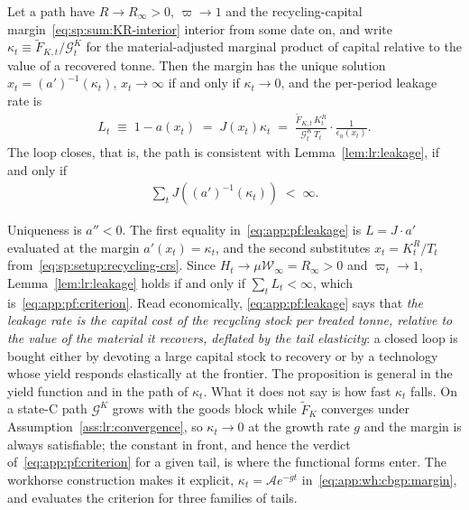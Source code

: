 \begin{proposition}\label{prop:app:pf:closure}
Let a path have $R\to R_\infty>0$, $\varpi\to1$ and the recycling-capital margin~\eqref{eq:sp:sum:KR-interior} interior from some date on, and write $\kappa_t\equiv\tilde F_{K,t}/\mathcal G^K_t$ for the material-adjusted marginal product of capital relative to the value of a recovered tonne. Then the margin has the unique solution $x_t=\left(a'\right)^{-1}\!\left(\kappa_t\right)$, $x_t\to\infty$ if and only if $\kappa_t\to0$, and the per-period leakage rate is
\begin{align}
L_t \;\equiv\; 1-a\left(x_t\right) \;=\; J\left(x_t\right)\kappa_t
\;=\; \frac{\tilde F_{K,t}\,K^R_t}{\mathcal G^K_t\,T_t}\cdot\frac{1}{\epsilon_a\left(x_t\right)} .
\label{eq:app:pf:leakage}
\end{align}
The loop closes, that is, the path is consistent with Lemma~\ref{lem:lr:leakage}, if and only if
\begin{align}
\sum_t J\!\left(\left(a'\right)^{-1}\!\left(\kappa_t\right)\right) \;<\;\infty .
\label{eq:app:pf:criterion}
\end{align}
\end{proposition}

Uniqueness is $a''<0$. The first equality in~\eqref{eq:app:pf:leakage} is $L=J\cdot a'$ evaluated at the margin $a'\left(x_t\right)=\kappa_t$, and the second substitutes $x_t=K^R_t/T_t$ from~\eqref{eq:sp:setup:recycling-crs}. Since $H_t\to\mu\mathcal W_\infty=R_\infty>0$ and $\varpi_t\to1$, Lemma~\ref{lem:lr:leakage} holds if and only if $\sum_tL_t<\infty$, which is~\eqref{eq:app:pf:criterion}. Read economically, \eqref{eq:app:pf:leakage} says that \emph{the leakage rate is the capital cost of the recycling stock per treated tonne, relative to the value of the material it recovers, deflated by the tail elasticity}: a closed loop is bought either by devoting a large capital stock to recovery or by a technology whose yield responds elastically at the frontier. The proposition is general in the yield function and in the path of $\kappa_t$. What it does not say is how fast $\kappa_t$ falls. On a state-C path $\mathcal G^K$ grows with the goods block while $\tilde F_K$ converges under Assumption~\ref{ass:lr:convergence}, so $\kappa_t\to0$ at the growth rate $g$ and the margin is always satisfiable; the constant in front, and hence the verdict of~\eqref{eq:app:pf:criterion} for a given tail, is where the functional forms enter. The workhorse construction makes it explicit, $\kappa_t=\mathcal Ae^{-gt}$ in~\eqref{eq:app:wh:cbgp:margin}, and evaluates the criterion for three families of tails.

